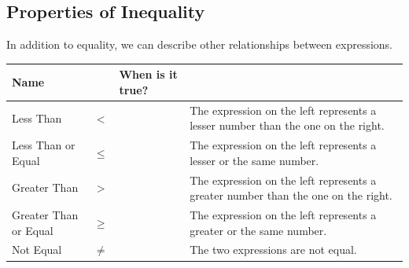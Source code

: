 \subsection{Properties of Inequality}
In addition to equality, we can describe other relationships between expressions.
\begin{center}
\begin{tabularx}{\textwidth-1pt}{|l|>{\hsize=0.375in\centering\arraybackslash}X|>{\hsize=0.375in\centering\arraybackslash}X|X|}
\hline
\textbf{Name}        &\multicolumn{2}{|c|}{\textbf{Symbol}}&\textbf{When is it true?}\\\hline
Less Than            &$<$   &&The expression on the left represents a lesser number than the one on the right.\\\hline
Less Than or Equal   &$\leq$&&The expression on the left represents a lesser or the same number.\\\hline
Greater Than         &$>$   &&The expression on the left represents a greater number than the one on the right.\\\hline
Greater Than or Equal&$\geq$&&The expression on the left represents a greater or the same number.\\\hline
Not Equal            &$\neq$&&The two expressions are not equal.\\\hline
\end{tabularx}
\end{center}
